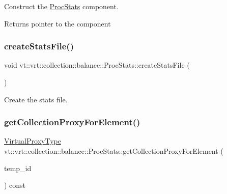 Construct the \hyperlink{structvt_1_1vrt_1_1collection_1_1balance_1_1_proc_stats}{Proc\+Stats} component. 

\begin{DoxyReturn}{Returns}
pointer to the component 
\end{DoxyReturn}
\mbox{\label{structvt_1_1vrt_1_1collection_1_1balance_1_1_proc_stats_a03755a56bad3f32736c8f823671bc848}} 
\subsubsection{\texorpdfstring{create\+Stats\+File()}{createStatsFile()}}
{\footnotesize\ttfamily void vt\+::vrt\+::collection\+::balance\+::\+Proc\+Stats\+::create\+Stats\+File (\begin{DoxyParamCaption}{ }\end{DoxyParamCaption})\hspace{0.3cm}{\ttfamily [private]}}



Create the stats file. 

\mbox{\label{structvt_1_1vrt_1_1collection_1_1balance_1_1_proc_stats_a2372ac6c5a73a3a1d198e8db225233d8}} 
\subsubsection{\texorpdfstring{get\+Collection\+Proxy\+For\+Element()}{getCollectionProxyForElement()}}
{\footnotesize\ttfamily \hyperlink{namespacevt_a1b417dd5d684f045bb58a0ede70045ac}{Virtual\+Proxy\+Type} vt\+::vrt\+::collection\+::balance\+::\+Proc\+Stats\+::get\+Collection\+Proxy\+For\+Element (\begin{DoxyParamCaption}\item[{\hyperlink{namespacevt_1_1vrt_1_1collection_1_1balance_a14c8d2c972f2913aa3f1636e5be0a120}{Element\+I\+D\+Type}}]{temp\+\_\+id }\end{DoxyParamCaption}) const}



